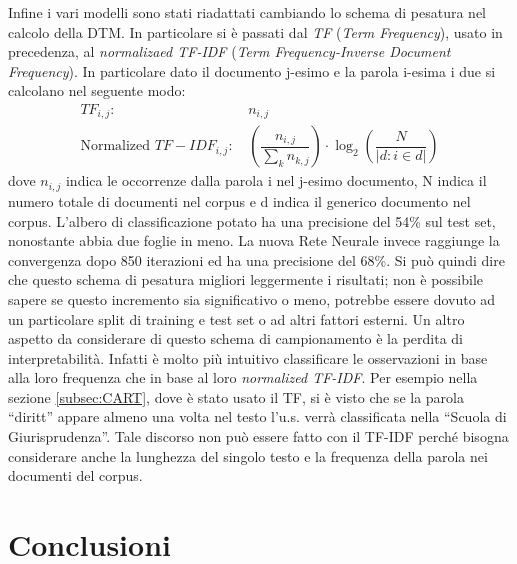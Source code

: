\documentclass[10pt,a4paper,twoside]{tau-book}
\begin{document}
Infine i vari modelli sono stati riadattati cambiando lo schema di pesatura nel calcolo della DTM. In particolare si è passati dal \textit{TF} (\textit{Term Frequency}), usato in precedenza, al \textit{normalizaed TF-IDF} (\textit{Term Frequency-Inverse Document Frequency}). In particolare dato il documento j-esimo e la parola i-esima i due si calcolano nel seguente modo:
\begin{equation}
\begin{aligned}
    TF_{i,j}\text{: }&n_{i,j} \\ \text{Normalized }TF-IDF_{i,j}\text{: }& \left( \dfrac{n_{i,j}}{\sum_k n_{k,j}} \right) \cdot \log_2 \left( \dfrac{N}{|d:i\in d|} \right)
\end{aligned}
\end{equation}
dove $n_{i,j}$ indica le occorrenze dalla parola i nel j-esimo documento, N indica il numero totale di documenti nel corpus e d indica il generico documento nel corpus.
L'albero di classificazione potato ha una precisione del 54\% sul test set, nonostante abbia due foglie in meno. La nuova Rete Neurale invece raggiunge la convergenza dopo 850 iterazioni ed ha una precisione del 68\%. Si può quindi dire che questo schema di pesatura migliori leggermente i risultati; non è possibile sapere se questo incremento sia significativo o meno, potrebbe essere dovuto ad un particolare split di training e test set o ad altri fattori esterni. Un altro aspetto da considerare di questo schema di campionamento è la perdita di interpretabilità. Infatti è molto più intuitivo classificare le osservazioni in base alla loro frequenza che in base al loro \textit{normalized TF-IDF}. Per esempio nella sezione \ref{subsec:CART}, dove è stato usato il TF, si è visto che se la parola “diritt” appare almeno una volta nel testo l'u.s. verrà classificata nella “Scuola di Giurisprudenza”. Tale discorso non può essere fatto con il TF-IDF perché bisogna considerare anche la lunghezza del singolo testo e la frequenza della parola nei documenti del corpus.

\section{Conclusioni}
\end{document}
